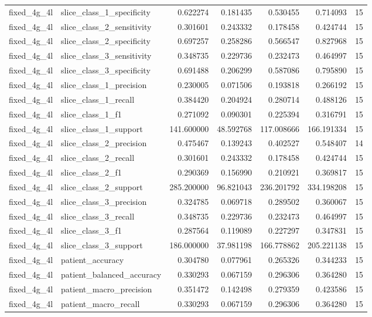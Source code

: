 \begin{tabular}{llrrrrr}
fixed_4g_4l & slice_class_1_specificity & 0.622274 & 0.181435 & 0.530455 & 0.714093 & 15 \\
fixed_4g_4l & slice_class_2_sensitivity & 0.301601 & 0.243332 & 0.178458 & 0.424744 & 15 \\
fixed_4g_4l & slice_class_2_specificity & 0.697257 & 0.258286 & 0.566547 & 0.827968 & 15 \\
fixed_4g_4l & slice_class_3_sensitivity & 0.348735 & 0.229736 & 0.232473 & 0.464997 & 15 \\
fixed_4g_4l & slice_class_3_specificity & 0.691488 & 0.206299 & 0.587086 & 0.795890 & 15 \\
fixed_4g_4l & slice_class_1_precision & 0.230005 & 0.071506 & 0.193818 & 0.266192 & 15 \\
fixed_4g_4l & slice_class_1_recall & 0.384420 & 0.204924 & 0.280714 & 0.488126 & 15 \\
fixed_4g_4l & slice_class_1_f1 & 0.271092 & 0.090301 & 0.225394 & 0.316791 & 15 \\
fixed_4g_4l & slice_class_1_support & 141.600000 & 48.592768 & 117.008666 & 166.191334 & 15 \\
fixed_4g_4l & slice_class_2_precision & 0.475467 & 0.139243 & 0.402527 & 0.548407 & 14 \\
fixed_4g_4l & slice_class_2_recall & 0.301601 & 0.243332 & 0.178458 & 0.424744 & 15 \\
fixed_4g_4l & slice_class_2_f1 & 0.290369 & 0.156990 & 0.210921 & 0.369817 & 15 \\
fixed_4g_4l & slice_class_2_support & 285.200000 & 96.821043 & 236.201792 & 334.198208 & 15 \\
fixed_4g_4l & slice_class_3_precision & 0.324785 & 0.069718 & 0.289502 & 0.360067 & 15 \\
fixed_4g_4l & slice_class_3_recall & 0.348735 & 0.229736 & 0.232473 & 0.464997 & 15 \\
fixed_4g_4l & slice_class_3_f1 & 0.287564 & 0.119089 & 0.227297 & 0.347831 & 15 \\
fixed_4g_4l & slice_class_3_support & 186.000000 & 37.981198 & 166.778862 & 205.221138 & 15 \\
fixed_4g_4l & patient_accuracy & 0.304780 & 0.077961 & 0.265326 & 0.344233 & 15 \\
fixed_4g_4l & patient_balanced_accuracy & 0.330293 & 0.067159 & 0.296306 & 0.364280 & 15 \\
fixed_4g_4l & patient_macro_precision & 0.351472 & 0.142498 & 0.279359 & 0.423586 & 15 \\
fixed_4g_4l & patient_macro_recall & 0.330293 & 0.067159 & 0.296306 & 0.364280 & 15 \\

\end{tabular}
